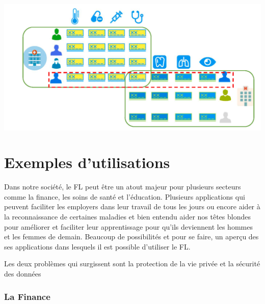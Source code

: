 \documentclass[12pt,a4paper]{report}
\begin{document}
\begin{center}
	\includegraphics[scale=0.2]{fl_distribute}
	\label{fig1}
\end{center}

\chapter{Exemples d'utilisations}

Dans notre société, le FL peut être un atout majeur pour plusieurs secteurs comme la finance, les soins de santé et l'éducation. Plusieurs applications qui peuvent faciliter les employers dans leur travail de tous les jours ou encore aider à la reconnaissance de certaines maladies et bien entendu aider nos têtes blondes pour améliorer et faciliter leur apprentissage pour qu'ils deviennent les hommes et les femmes de demain. Beaucoup de possibilités et pour se faire, un aperçu des ses applications dans lesquels il est possible d'utiliser le FL. 


Les deux problèmes qui surgissent sont la protection de la vie privée et la sécurité des données

\subsection{La Finance}
\end{document}
